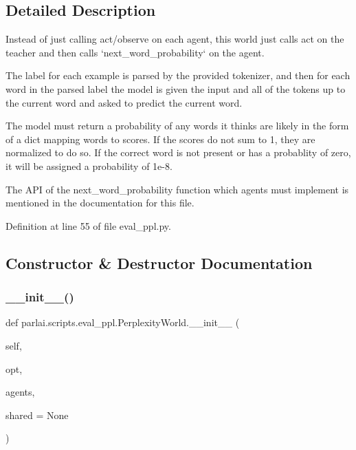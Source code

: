 \subsection{Detailed Description}
\begin{DoxyVerb}Instead of just calling act/observe on each agent, this world just calls act on the
teacher and then calls `next_word_probability` on the agent.

The label for each example is parsed by the provided tokenizer, and then
for each word in the parsed label the model is given the input and all of
the tokens up to the current word and asked to predict the current word.

The model must return a probability of any words it thinks are likely in
the form of a dict mapping words to scores. If the scores do not sum to 1,
they are normalized to do so. If the correct word is not present or has a
probablity of zero, it will be assigned a probability of 1e-8.

The API of the next_word_probability function which agents must implement
is mentioned in the documentation for this file.
\end{DoxyVerb}
 

Definition at line 55 of file eval\+\_\+ppl.\+py.



\subsection{Constructor \& Destructor Documentation}
\mbox{\label{classparlai_1_1scripts_1_1eval__ppl_1_1PerplexityWorld_a28918c916f0ee900c655359388411f84}} 
\subsubsection{\texorpdfstring{\+\_\+\+\_\+init\+\_\+\+\_\+()}{\_\_init\_\_()}}
{\footnotesize\ttfamily def parlai.\+scripts.\+eval\+\_\+ppl.\+Perplexity\+World.\+\_\+\+\_\+init\+\_\+\+\_\+ (\begin{DoxyParamCaption}\item[{}]{self,  }\item[{}]{opt,  }\item[{}]{agents,  }\item[{}]{shared = {\ttfamily None} }\end{DoxyParamCaption})}



